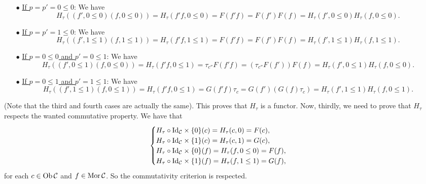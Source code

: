 \documentclass[11pt, a4paper, twoside]{article}
\begin{document}
 	\begin{itemize}
		\item[$\bullet$] \underline{If $p=p'=0\leq0$}: We have $$H_\tau((f',0\leq0)(f,0\leq0))=H_\tau(f'f,0\leq0)=F(f'f)=F(f')F(f)=H_\tau(f',0\leq0)H_\tau(f,0\leq0).$$
		\item[$\bullet$] \underline{If $p=p'=1\leq0$}: We have $$H_\tau((f',1\leq1)(f,1\leq1))=H_\tau(f'f,1\leq1)=F(f'f)=F(f')F(f)=H_\tau(f',1\leq1)H_\tau(f,1\leq1).$$
		\item[$\bullet$] \underline{If $p=0\leq0$ and $p'=0\leq1$}: We have $$H_\tau((f',0\leq1)(f,0\leq0))=H_\tau(f'f,0\leq1)=\tau_{c''}F(f'f)=(\tau_{c''}F(f'))F(f)=H_\tau(f',0\leq1)H_\tau(f,0\leq0).$$
		\item[$\bullet$] \underline{If $p=0\leq1$ and $p'=1\leq1$}:  We have $$H_\tau((f',1\leq1)(f,0\leq1))=H_\tau(f'f,0\leq1)=G(f'f)\tau_{c}=G(f')(G(f)\tau_{c})=H_\tau(f',1\leq1)H_\tau(f,0\leq1).$$
	\end{itemize}
	(Note that the third and fourth cases are actually the same). This proves that $H_\tau$ is a functor. Now, thirdly, we need to prove that $H_\tau$ respects the wanted commutative property. We have that
	$$\begin{cases}
		 H_\tau\circ\mathrm{Id}_{\mathcal{C}}\times\{0\}(c)=H_\tau(c,0)=F(c), \\
		 H_\tau\circ\mathrm{Id}_{\mathcal{C}}\times\{1\}(c)=H_\tau(c,1)=G(c), \\
		 H_\tau\circ\mathrm{Id}_{\mathcal{C}}\times\{0\}(f)=H_\tau(f,0\leq0)=F(f), \\
		 H_\tau\circ\mathrm{Id}_{\mathcal{C}}\times\{1\}(f)=H_\tau(f,1\leq1)=G(f),
	\end{cases}$$
	for each $c\in\operatorname{Ob}\mathcal{C}$ and $f\in\operatorname{Mor}\mathcal{C}$. So the commutativity criterion is respected.\newpage
	
\end{document}
